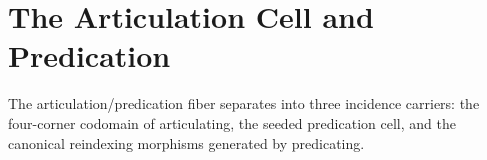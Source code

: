 \chapter{The Articulation Cell and Predication}\label{ch:predicating}

The articulation/predication fiber separates into three incidence carriers:
the four-corner codomain of articulating, the seeded predication cell, and the
canonical reindexing morphisms generated by predicating.




